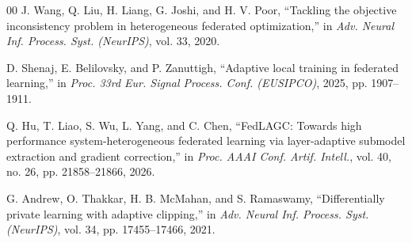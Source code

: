\documentclass[conference]{IEEEtran}
\begin{document}
\begin{thebibliography}{00}
J. Wang, Q. Liu, H. Liang, G. Joshi, and H. V. Poor, ``Tackling the objective inconsistency problem in heterogeneous federated optimization,'' in \textit{Adv. Neural Inf. Process. Syst. (NeurIPS)}, vol. 33, 2020.

D. Shenaj, E. Belilovsky, and P. Zanuttigh, ``Adaptive local training in federated learning,'' in \textit{Proc. 33rd Eur. Signal Process. Conf. (EUSIPCO)}, 2025, pp. 1907--1911.

Q. Hu, T. Liao, S. Wu, L. Yang, and C. Chen, ``FedLAGC: Towards high performance system-heterogeneous federated learning via layer-adaptive submodel extraction and gradient correction,'' in \textit{Proc. AAAI Conf. Artif. Intell.}, vol. 40, no. 26, pp. 21858--21866, 2026.

G. Andrew, O. Thakkar, H. B. McMahan, and S. Ramaswamy, ``Differentially private learning with adaptive clipping,'' in \textit{Adv. Neural Inf. Process. Syst. (NeurIPS)}, vol. 34, pp. 17455--17466, 2021.

\end{thebibliography}
\end{document}
